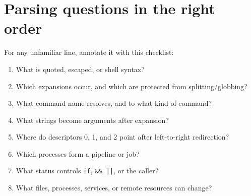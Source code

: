 \documentclass[11pt,oneside,openany]{book}
\begin{document}
\section{Parsing questions in the right order}
For any unfamiliar line, annotate it with this checklist:
\begin{enumerate}
  \item What is quoted, escaped, or shell syntax?
  \item Which expansions occur, and which are protected from splitting/globbing?
  \item What command name resolves, and to what kind of command?
  \item What strings become arguments after expansion?
  \item Where do descriptors 0, 1, and 2 point after left-to-right redirection?
  \item Which processes form a pipeline or job?
  \item What status controls \texttt{if}, \texttt{\&\&}, \texttt{||}, or the caller?
  \item What files, processes, services, or remote resources can change?
\end{enumerate}
\end{document}
